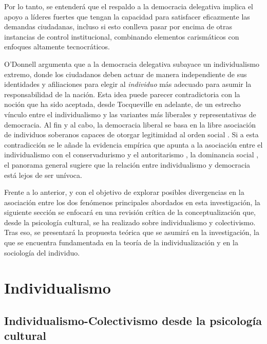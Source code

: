 \documentclass[12pt,twoside]{templates/facsothesis}
\begin{document}
Por lo tanto, se entenderá que el respaldo a la democracia delegativa implica el apoyo a líderes fuertes que tengan la capacidad para satisfacer eficazmente las demandas ciudadanas, incluso si esto conlleva pasar por encima de otras instancias de control institucional, combinando elementos carismáticos con enfoques altamente tecnocráticos.

O'Donnell \citeyearpar{odonnell1994} argumenta que a la democracia delegativa subayace un individualismo extremo, donde los ciudadanos deben actuar de manera independiente de sus identidades y afiliaciones para elegir al \emph{individuo} más adecuado para asumir la responsabilidad de la nación. Esta idea puede parecer contradictoria con la noción que ha sido aceptada, desde Tocqueville en adelante, de un estrecho vínculo entre el individualismo y las variantes más liberales y representativas de democracia. Al fin y al cabo, la democracia liberal se basa en la libre asociación de individuos soberanos capaces de otorgar legitimidad al orden social \citep{martuccelli2010}. Si a esta contradicción se le añade la evidencia empírica que apunta a la asociación entre el individualismo con el conservadurismo \citep{zhang2009} y el autoritarismo \citep{kemmelmeier2003}, la dominancia social \citep{strunk1999}, el panorama general sugiere que la relación entre individualismo y democracia está lejos de ser unívoca.

Frente a lo anterior, y con el objetivo de explorar posibles divergencias en la asociación entre los dos fenómenos principales abordados en esta investigación, la siguiente sección se enfocará en una revisión crítica de la conceptualización que, desde la psicología cultural, se ha realizado sobre individualismo y colectivismo. Tras eso, se presentará la propuesta teórica que se asumirá en la investigación, la que se encuentra fundamentada en la teoría de la individualización y en la sociología del individuo.

\hypertarget{individualismo}{%
\section{Individualismo}\label{individualismo}}

\hypertarget{individualismo-colectivismo-desde-la-psicologuxeda-cultural}{%
\subsection{Individualismo-Colectivismo desde la psicología cultural}\label{individualismo-colectivismo-desde-la-psicologuxeda-cultural}}
\end{document}
